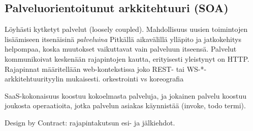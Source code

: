 \documentclass[finnish,gradu]{tktltiki}
\begin{document}


  \subsection{Palveluorientoitunut arkkitehtuuri (SOA)} %
  \label{sub:arkkitehtuurityyli_soa}

  Löyhästi kytketyt palvelut (loosely coupled).
  Mahdollisuus uusien toimintojen lisäämiseen itsenäisinä \emph{palveluina}
  Pitkällä aikavälillä ylläpito ja jatkokehitys helpompaa, koska muutokset vaikuttavat vain palveluun itseensä.
  Palvelut kommunikoivat keskenään rajapintojen kautta, erityisesti yleistynyt on HTTP.
  Rajapinnat määritellään web-kontekstissa joko REST- tai WS-*-arkkitehtuurityylin mukaisesti.
  orkestrointi vs koreografia

  SaaS-kokonaisuus koostuu kokoelmasta palveluja, ja jokainen palvelu koostuu joukosta operaatioita, jotka palvelun asiakas käynnistää (invoke, todo termi).

  Design by Contract: rajapintakutsun esi- ja jälkiehdot.




\end{document}
